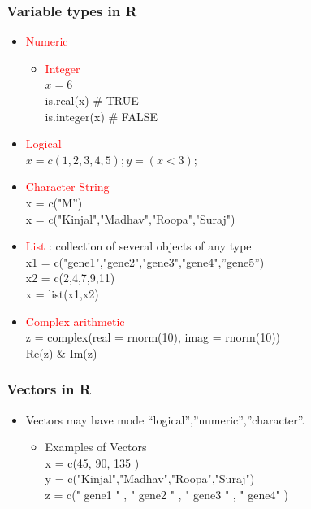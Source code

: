 \documentclass[12pt]{beamer}
\begin{document}
\begin{frame}[fragile]
\frametitle{Variable types in R }
\begin{itemize}\justifying
	\item \textcolor{red}{Numeric}
	\begin{itemize}\justifying
		\item \textcolor{red}{Integer} \\
		$x = 6$\\
		is.real(x) \hfill \# TRUE\\
		is.integer(x)  \hfill \# FALSE\\
	\end{itemize}
	\item \textcolor{red}{Logical}\\
	$x = c(1,2,3,4,5); y = (x<3);$
	\item \textcolor{red}{Character String}\\
	x = c("M”)\\
	x = c("Kinjal","Madhav","Roopa","Suraj")\\
	\item \textcolor{red}{List} : collection of several objects of any type\\
	x1 = c("gene1","gene2","gene3","gene4",”gene5”)\\
	x2 = c(2,4,7,9,11)\\
	x = list(x1,x2)
	\item \textcolor{red}{Complex arithmetic}\\
	z = complex(real = rnorm(10), imag = rnorm(10))\\
	Re(z) \&	Im(z)\\
\end{itemize}
\end{frame}

\begin{frame}[fragile]
\frametitle{Vectors in R}
\begin{itemize}\justifying
	\item Vectors may have mode “logical”,”numeric”,”character”.
	\begin{itemize}\justifying
		\item Examples of Vectors\\
		x = c(45, 90, 135 )\\
		y = c("Kinjal","Madhav","Roopa","Suraj")\\
		z = c(" gene1 " , " gene2 " , " gene3 " , " gene4" )
	\end{itemize}
\end{itemize}
\end{frame}
\end{document}
